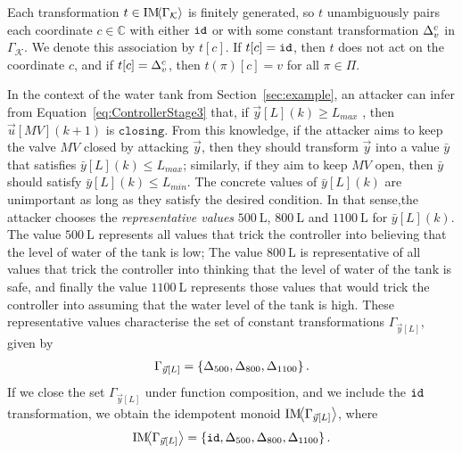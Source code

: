 {{\begin{definition}
Each transformation $t\in \text{IM}\!{{\left<\Gamma_{\mathcal{K}}\right>}}$ is finitely generated, so $t$ unambiguously pairs each coordinate $c\in \mathbb{C}$ with either ${\texttt{id}}$ or with some constant transformation ${\Delta}^{c}_{v}$ in $\Gamma_{\mathcal{K}}$.  We denote this association by $t[c]$. If $t[c]={\texttt{id}}$, then $t$ does not act on the coordinate $c$, and if $t[c]={\Delta}^{c}_{v}$, then $t(\pi)[c]=v$ for all $\pi \in \Pi$.
\end{definition}
\begin{example}
  In the context of the water tank from Section~\ref{sec:example}, an attacker can infer from Equation~\ref{eq:ControllerStage3} that, if $\vec{y}[L](k)\geq L_{max}$%
  , then $\vec{u}[MV](k+1)$ is $\texttt{closing}$. From this knowledge, if the attacker aims to keep the valve $MV$ closed by attacking $\vec{y}$, then they should transform $\vec{y}$ into a value $\bar{y}$ that satisfies $\bar{y}[L](k)\leq L_{max}$; similarly, if they aim to keep $MV$ open, then $\bar{y}$ should satisfy $\bar{y}[L](k)\leq L_{min}$. The concrete values of $\bar{y}[L](k)$ are unimportant as long as they satisfy the desired condition. In that sense,the attacker chooses the \emph{representative values} $500~\mathrm{L}$, $800~\mathrm{L}$ and $1100~\mathrm{L}$ for $\bar{y}[L](k)$. The value $500~\mathrm{L}$ represents all values that trick the controller into believing that the level of water of the tank is low; The value $800~\mathrm{L}$ is representative of all values that trick the controller into thinking that the level of water of the tank is safe, and finally the value  $1100~\mathrm{L}$ represents those values that would trick the controller into assuming that the water level of the tank is high.  
  These representative values characterise the set of constant transformations $\Gamma_{\vec{y}[L]}$, given by
\begin{align}
  \Gamma_{\vec{y}[L]}=\left\{{\Delta}_{500}, {\Delta}_{800},  {\Delta}_{1100}\right\}.
\end{align}
If we close the set $\Gamma_{\vec{y}[L]}$ under function composition, and we include the ${\texttt{id}}$ transformation, we obtain the idempotent monoid $\text{IM}\!{{\left<\Gamma_{\vec{y}[L]}\right>}}$, where 
\begin{align*}
  \text{IM}\!{{\left<\Gamma_{\vec{y}[L]}\right>}} =\left\{{\texttt{id}}, {\Delta}_{500}, {\Delta}_{800},{\Delta}_{1100}\right\}.
\end{align*} 
\end{example}

}}

